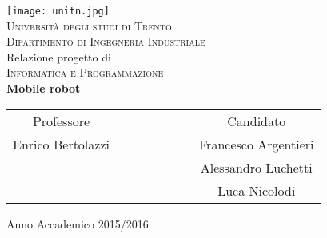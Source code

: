 
\begin{titlepage}
 \begin{center}
     \texttt{[image: unitn.jpg]}\\
     \vspace{1em}
     {\Large \textsc{Università degli studi di Trento}}\\
     \vspace{1em}
     {\Large \textsc{Dipartimento di Ingegneria Industriale}}\\
     \vspace{4em}
     {\normalsize Relazione progetto di }\\
     \vspace{1em}
     {\Large \textsc{Informatica e Programmazione}}\\
     \vspace{4em}
     {\LARGE\textbf{
     	Mobile robot\\\vspace{0.4em}
     }}
 \end{center}

\vskip 2.0cm
  \begin{center}
    \begin{tabular}{c c c c c c c c}
      Professore & & & & & & & Candidato \\[0.2cm]
      \large{Enrico Bertolazzi} & & & & & & & \large{Francesco Argentieri}\\[0.2cm]
      & & & & & & & \large{Alessandro Luchetti}\\[0.2cm]
      & & & & & & & \large{Luca Nicolodi}\\    [0.2cm]
    \end{tabular}
  \end{center}

\vskip 1.5cm
\begin{center}
{\normalsize Anno Accademico 2015/2016}
\end{center}
\end{titlepage}

\clearpage{\pagestyle{empty}\cleardoublepage}
